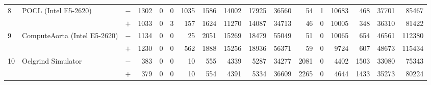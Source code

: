 \begin{tabular}{lll | rrrrrrr | rrrrrrr }
\hline
\multirow{ 2}{*}{8} & \multirow{ 2}{*}{POCL (Intel E5-2620)} & $-$ & 1302 & 0 & 0 & 1035 & 1586 & 14002 & 17925       & 36560 & 54 & 1 & 10683 & 468 & 37701 & 85467 \\& & $+$ & 1033 & 0 & 3 & 157 & 1624 & 11270 & 14087 & 34713 & 46 & 0 & 10005 & 348 & 36310 & 81422 \\
\hline
\multirow{ 2}{*}{9} & \multirow{ 2}{*}{ComputeAorta (Intel E5-2620)} & $-$ & 1134 & 0 & 0 & 25 & 2051 & 15269 & 18479       & 55049 & 51 & 0 & 10065 & 654 & 46561 & 112380 \\& & $+$ & 1230 & 0 & 0 & 562 & 1888 & 15256 & 18936 & 56371 & 59 & 0 & 9724 & 607 & 48673 & 115434 \\
\hline
\multirow{ 2}{*}{10} & \multirow{ 2}{*}{Oclgrind Simulator} & $-$ & 383 & 0 & 0 & 10 & 555 & 4339 & 5287       & 34277 & 2081 & 0 & 4402 & 1503 & 33080 & 75343 \\& & $+$ & 379 & 0 & 0 & 10 & 554 & 4391 & 5334 & 36609 & 2265 & 0 & 4644 & 1433 & 35273 & 80224 \\
  \bottomrule
\end{tabular}

